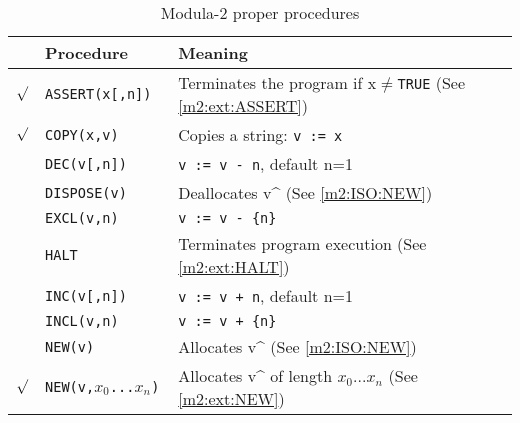 \begin{table}[hbt]
\begin{center}
\begin{tabular}{clp{8cm}}
&\bf Procedure &\bf  Meaning \\ \hline
$\surd$ & \tt ASSERT(x[,n]) & Terminates the program
                 if x$\neq$\verb'TRUE' (See \ref{m2:ext:ASSERT})       \\ \index{ASSERT}
$\surd$ & \tt  COPY(x,v)     & Copies a string: \verb|v := x|       \\ \index{COPY}
&\tt DEC(v[,n])    & \verb|v := v - n|, default n=1             \\ \index{DEC}
&\tt DISPOSE(v)    & Deallocates v\^{} (See \ref{m2:ISO:NEW}) \\ \index{DISPOSE}
&\tt EXCL(v,n)     & \verb|v := v - {n}| \\                    \index{EXCL}
&\tt HALT          & Terminates program execution
                 (See \ref{m2:ext:HALT}) \\                    \index{HALT}
&\tt INC(v[,n])    & \verb|v := v + n|, default n=1 \\         \index{INC}
&\tt INCL(v,n)     & \verb|v := v + {n}| \\                    \index{INCL}
&\tt NEW(v)        & Allocates v\^{} (See \ref{m2:ISO:NEW}) \\
$\surd$ & \tt NEW(v,$x_0$...$x_n$) & Allocates v\^{} of
        length $x_0$...$x_n$  (See \ref{m2:ext:NEW}) \\  %
\end{tabular}
\end{center}
\caption{Modula-2 proper procedures}\label{table:m2:stdproc}
\end{table}

